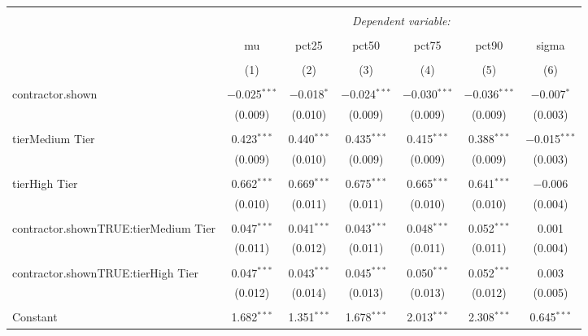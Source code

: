 
\begin{table}[!htbp] \centering 
  \caption{} 
  \label{} 
\begin{tabular}{@{\extracolsep{5pt}}lcccccc} 
\\[-1.8ex]\hline 
\hline \\[-1.8ex] 
 & \multicolumn{6}{c}{\textit{Dependent variable:}} \\ 
\cline{2-7} 
\\[-1.8ex] & mu & pct25 & pct50 & pct75 & pct90 & sigma \\ 
\\[-1.8ex] & (1) & (2) & (3) & (4) & (5) & (6)\\ 
\hline \\[-1.8ex] 
 contractor.shown & $-$0.025$^{***}$ & $-$0.018$^{*}$ & $-$0.024$^{***}$ & $-$0.030$^{***}$ & $-$0.036$^{***}$ & $-$0.007$^{*}$ \\ 
  & (0.009) & (0.010) & (0.009) & (0.009) & (0.009) & (0.003) \\ 
  & & & & & & \\ 
 tierMedium Tier & 0.423$^{***}$ & 0.440$^{***}$ & 0.435$^{***}$ & 0.415$^{***}$ & 0.388$^{***}$ & $-$0.015$^{***}$ \\ 
  & (0.009) & (0.010) & (0.009) & (0.009) & (0.009) & (0.003) \\ 
  & & & & & & \\ 
 tierHigh Tier & 0.662$^{***}$ & 0.669$^{***}$ & 0.675$^{***}$ & 0.665$^{***}$ & 0.641$^{***}$ & $-$0.006 \\ 
  & (0.010) & (0.011) & (0.011) & (0.010) & (0.010) & (0.004) \\ 
  & & & & & & \\ 
 contractor.shownTRUE:tierMedium Tier & 0.047$^{***}$ & 0.041$^{***}$ & 0.043$^{***}$ & 0.048$^{***}$ & 0.052$^{***}$ & 0.001 \\ 
  & (0.011) & (0.012) & (0.011) & (0.011) & (0.011) & (0.004) \\ 
  & & & & & & \\ 
 contractor.shownTRUE:tierHigh Tier & 0.047$^{***}$ & 0.043$^{***}$ & 0.045$^{***}$ & 0.050$^{***}$ & 0.052$^{***}$ & 0.003 \\ 
  & (0.012) & (0.014) & (0.013) & (0.013) & (0.012) & (0.005) \\ 
  & & & & & & \\ 
 Constant & 1.682$^{***}$ & 1.351$^{***}$ & 1.678$^{***}$ & 2.013$^{***}$ & 2.308$^{***}$ & 0.645$^{***}$ \\ 

\end{tabular}
\end{table}
